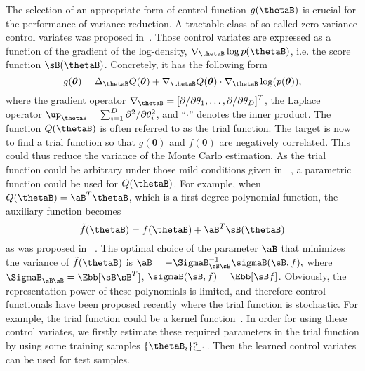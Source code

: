 \documentclass[runningheads]{llncs}
\begin{document}
The selection of an appropriate form of control function $g(\thetaB)$ is crucial for the performance of variance reduction.  A tractable class of so called zero-variance control variates was proposed in~\cite{assaraf1999zero,mira2013zero}. Those control variates are expressed as a function of the gradient of the log-density, $\nabla_{\thetaB} \log p(\thetaB)$, i.e. the score function $\sB(\thetaB)$. Concretely, it has the following form
\begin{equation}
g(\bm{\theta}) = \Delta_{\thetaB} Q(\bm{\theta}) + \nabla_{\thetaB} Q(\bm{\theta}) \cdot \nabla_{{\thetaB}} \log (p(\bm{\theta})),
\label{eq:laplacecv}
\end{equation}
where the gradient operator $\nabla_{\thetaB} = [\partial/\partial \theta_1, \dots, \partial/\partial \theta_D]^T$, the Laplace operator $\up_{\thetaB} = \sum_{i=1}^D \partial^2 / \partial \theta_i^2$, and ``$\cdot$'' denotes the inner product. The function $Q(\thetaB)$ is often referred to as the trial function. The target is now to find a trial function so that $g(\bm{\theta})$ and $f(\bm{\theta})$ are negatively correlated. This could thus reduce the variance of the Monte Carlo estimation.  %
As the trial function could be arbitrary under those mild conditions given in ~\cite{mira2013zero}, a parametric function could be used for $Q(\thetaB)$. For example, when $Q(\thetaB)  = \aB^T \thetaB$, which is a first degree polynomial function, the auxiliary function becomes 
\begin{equation}
\tilde{f}(\thetaB) = f(\thetaB) + \aB^T \sB(\thetaB)
\end{equation}
 as was proposed in ~\cite{mira2013zero}. The optimal choice of the parameter $\aB$ that minimizes the variance of $\tilde{f}(\thetaB)$ is 
$
\aB = - \SigmaB_{\sB \sB}^{-1} \sigmaB(\sB, f), \label{eq:a} 
$
where $\SigmaB_{\sB \sB} = \Ebb [\sB \sB^T]$,  $\sigmaB(\sB, f) = \Ebb[\sB f]$. Obviously, the representation power of these polynomials is limited, and therefore control functionals have been proposed recently where the trial function is stochastic. For example, the trial function could be a kernel function~\cite{oates2017control}.
In order for using these control variates, we firstly estimate these required parameters in the trial function by using some training samples $\{ \thetaB_i \}_{i=1}^n$. Then the learned control variates can be used for test samples.
\end{document}
